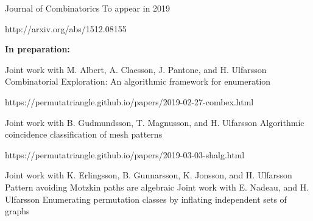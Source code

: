 \begin{cventries}
    {Journal of Combinatorics} %
    {To appear in 2019} %
    {
      \begin{cvitems} %
        \item {http://arxiv.org/abs/1512.08155}
      \end{cvitems}
    }%
\begin{flushleft}
  \textbf{In preparation:}
\end{flushleft}
\cventry
{Joint work with M. Albert, A. Claesson, J. Pantone, and H. Ulfarsson} %
{Combinatorial Exploration: An algorithmic framework for enumeration} %
{} %
{} %
{
  \begin{cvitems} %
    \item {https://permutatriangle.github.io/papers/2019-02-27-combex.html}
  \end{cvitems}
}%
\cventry
{Joint work with B. Gudmundsson, T. Magnusson, and H. Ulfarsson} %
{Algorithmic coincidence classification of mesh patterns} %
{} %
{} %
{
  \begin{cvitems} %
    \item {https://permutatriangle.github.io/papers/2019-03-03-shalg.html}
  \end{cvitems}
}%
\cventry
{Joint work with K. Erlingsson, B. Gunnarsson, K. Jonsson, and H. Ulfarsson} %
{Pattern avoiding Motzkin paths are algebraic} %
{} %
{} %
{
}%
\cventry
{Joint work with E. Nadeau, and H. Ulfarsson} %
{Enumerating permutation classes by inflating independent sets of graphs} %
{} %
{} %
{
}%
\end{cventries}
